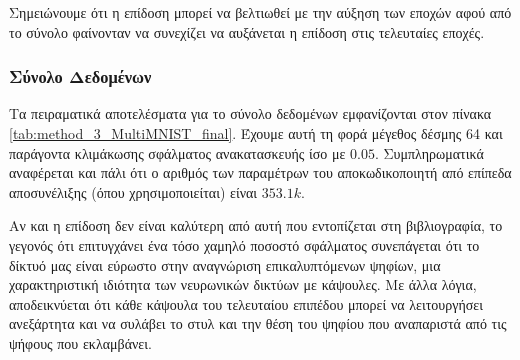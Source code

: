 Σημειώνουμε ότι η επίδοση μπορεί να βελτιωθεί με την αύξηση των εποχών αφού από το σύνολο  φαίνονταν να συνεχίζει να αυξάνεται η επίδοση στις τελευταίες εποχές.

\subsubsection{Σύνολο Δεδομένων }

Τα πειραματικά αποτελέσματα για το σύνολο δεδομένων  εμφανίζονται στον πίνακα \ref{tab:method_3_MultiMNIST_final}. Έχουμε αυτή τη φορά μέγεθος δέσμης 64 και παράγοντα κλιμάκωσης σφάλματος ανακατασκευής ίσο με $0.05$. Συμπληρωματικά αναφέρεται και πάλι ότι ο αριθμός των παραμέτρων του αποκωδικοποιητή από επίπεδα αποσυνέλιξης (όπου χρησιμοποιείται) είναι $353.1k$.

\begin{table}[h]
    \begin{center}
    \end{center}
    \caption[]{\label{tab:method_3_MultiMNIST_final}Επίδοση των αλγορίθμων της μεθόδου 3 στο σύνολο δεδομένων , όταν χρησιμοποιούνται 300 εποχές για την εκπαίδευση του μοντέλου με μέγεθος δέσμης 32.} 
\end{table}

Αν και η επίδοση δεν είναι καλύτερη από αυτή που εντοπίζεται στη βιβλιογραφία, το γεγονός ότι επιτυγχάνει ένα τόσο χαμηλό ποσοστό σφάλματος συνεπάγεται ότι το δίκτυό μας είναι εύρωστο στην αναγνώριση επικαλυπτόμενων ψηφίων, μια χαρακτηριστική ιδιότητα των νευρωνικών δικτύων με κάψουλες. Με άλλα λόγια, αποδεικνύεται ότι κάθε κάψουλα του τελευταίου επιπέδου μπορεί να λειτουργήσει ανεξάρτητα και να συλάβει το στυλ και την θέση του ψηφίου που αναπαριστά από τις ψήφους που εκλαμβάνει.

